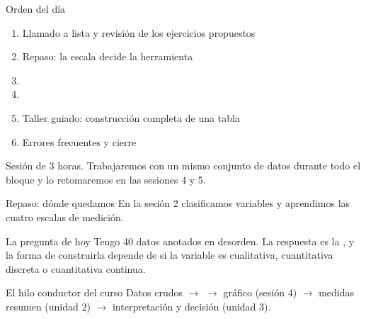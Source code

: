\documentclass[aspectratio=169,10pt]{beamer}
\begin{document}
\portada

\begin{frame}{Orden del día}
  \begin{enumerate}
    \item Llamado a lista y revisión de los ejercicios propuestos
    \item Repaso: la escala decide la herramienta
    \item {}
    \item {}
    \item Taller guiado: construcción completa de una tabla
    \item Errores frecuentes y cierre
  \end{enumerate}

  \vspace{0.3cm}
  {\footnotesize\color{uniGris} Sesión de 3 horas. Trabajaremos con un mismo
  conjunto de datos durante todo el bloque y lo retomaremos en las sesiones 4 y 5.}
\end{frame}

\begin{frame}{Repaso: dónde quedamos}
  En la sesión 2 clasificamos variables y aprendimos las cuatro escalas de
  medición.

  \vspace{0.25cm}
  \begin{alertblock}{La pregunta de hoy}
    \footnotesize
    Tengo 40 datos anotados en desorden.  La respuesta es la , y la forma de construirla depende de si la variable es
    cualitativa, cuantitativa discreta o cuantitativa continua.
  \end{alertblock}

  \vspace{0.2cm}
  \begin{block}{El hilo conductor del curso}
    \footnotesize
    Datos crudos $\rightarrow$  $\rightarrow$ gráfico (sesión 4)
    $\rightarrow$ medidas resumen (unidad 2) $\rightarrow$ interpretación y
    decisión (unidad 3).
  \end{block}
\end{frame}
\end{document}
